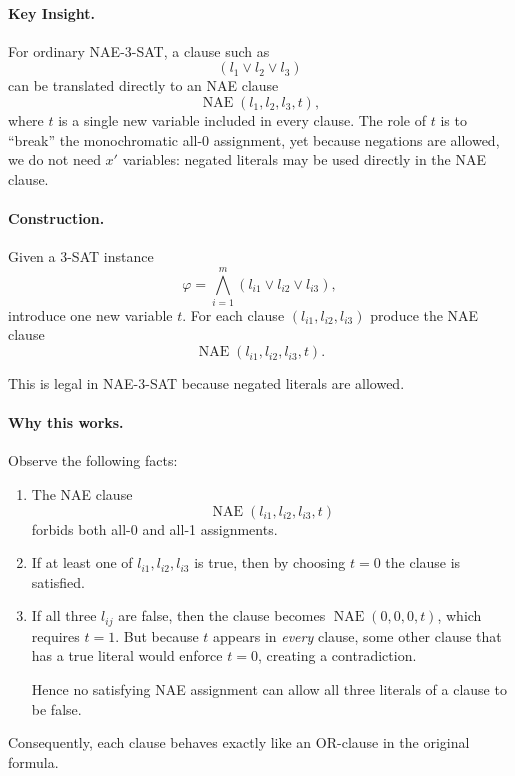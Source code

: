 \documentclass[9pt]{extarticle}
\begin{document}
\paragraph{Key Insight.}
For ordinary NAE-3-SAT, a clause such as
\[
(l_1 \lor l_2 \lor l_3)
\]
can be translated directly to an NAE clause
\[
\operatorname{NAE}(l_1, l_2, l_3, t),
\]
where $t$ is a single new variable included in every clause.
The role of $t$ is to “break” the monochromatic all-0 assignment, yet because
negations are allowed, we do not need $x'$ variables: negated literals may be
used directly in the NAE clause.

\paragraph{Construction.}

Given a 3-SAT instance
\[
\varphi = \bigwedge_{i=1}^m (l_{i1} \lor l_{i2} \lor l_{i3}),
\]
introduce one new variable $t$.  
For each clause $(l_{i1},l_{i2},l_{i3})$ produce the NAE clause
\[
\operatorname{NAE}(l_{i1}, l_{i2}, l_{i3}, t).
\]

This is legal in NAE-3-SAT because negated literals are allowed.

\paragraph{Why this works.}
Observe the following facts:

\begin{enumerate}
    \item The NAE clause 
    \[
        \operatorname{NAE}(l_{i1},l_{i2},l_{i3},t)
    \]
    forbids both all-0 and all-1 assignments.

    \item If at least one of $l_{i1},l_{i2},l_{i3}$ is true, then by choosing
    $t=0$ the clause is satisfied.

    \item If all three $l_{ij}$ are false, then the clause becomes
    $\operatorname{NAE}(0,0,0,t)$, which requires $t=1$.
    But because $t$ appears in \emph{every} clause, some other clause that has a
    true literal would enforce $t=0$, creating a contradiction.

    Hence no satisfying NAE assignment can allow all three literals of a clause
    to be false.
\end{enumerate}

Consequently, each clause behaves exactly like an OR-clause in the original
formula.
\end{document}
